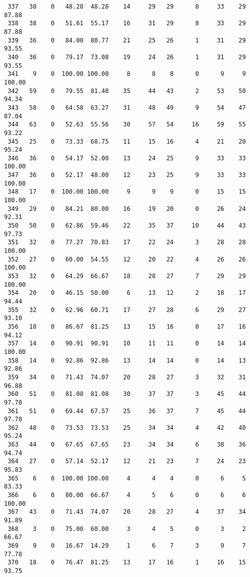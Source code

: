\begin{verbatim}
 337   38    0   48.28  48.28    14     29   29      8     33    29    87.88
 338   38    0   51.61  55.17    16     31   29      8     33    29    87.88
 339   36    0   84.00  80.77    21     25   26      1     31    29    93.55
 340   36    0   79.17  73.08    19     24   26      1     31    29    93.55
 341    9    0  100.00 100.00     8      8    8      0      9     9   100.00
 342   59    0   79.55  81.40    35     44   43      2     53    50    94.34
 343   58    0   64.58  63.27    31     48   49      9     54    47    87.04
 344   63    0   52.63  55.56    30     57   54     16     59    55    93.22
 345   25    0   73.33  68.75    11     15   16      4     21    20    95.24
 346   36    0   54.17  52.00    13     24   25      9     33    33   100.00
 347   36    0   52.17  48.00    12     23   25      9     33    33   100.00
 348   17    0  100.00 100.00     9      9    9      0     15    15   100.00
 349   29    0   84.21  80.00    16     19   20      0     26    24    92.31
 350   50    0   62.86  59.46    22     35   37     10     44    43    97.73
 351   32    0   77.27  70.83    17     22   24      3     28    28   100.00
 352   27    0   60.00  54.55    12     20   22      4     26    26   100.00
 353   32    0   64.29  66.67    18     28   27      7     29    29   100.00
 354   20    0   46.15  50.00     6     13   12      2     18    17    94.44
 355   32    0   62.96  60.71    17     27   28      6     29    27    93.10
 356   18    0   86.67  81.25    13     15   16      0     17    16    94.12
 357   14    0   90.91  90.91    10     11   11      0     14    14   100.00
 358   14    0   92.86  92.86    13     14   14      0     14    13    92.86
 359   34    0   71.43  74.07    20     28   27      3     32    31    96.88
 360   51    0   81.08  81.08    30     37   37      3     45    44    97.78
 361   51    0   69.44  67.57    25     36   37      7     45    44    97.78
 362   48    0   73.53  73.53    25     34   34      4     42    40    95.24
 363   44    0   67.65  67.65    23     34   34      6     38    36    94.74
 364   27    0   57.14  52.17    12     21   23      7     24    23    95.83
 365    6    0  100.00 100.00     4      4    4      0      6     5    83.33
 366    6    0   80.00  66.67     4      5    6      0      6     6   100.00
 367   43    0   71.43  74.07    20     28   27      4     37    34    91.89
 368    3    0   75.00  60.00     3      4    5      0      3     2    66.67
 369    9    0   16.67  14.29     1      6    7      3      9     7    77.78
 370   18    0   76.47  81.25    13     17   16      1     16    15    93.75

\end{verbatim}
